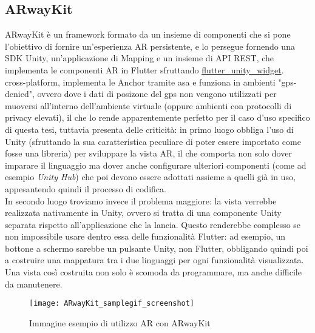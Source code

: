 \subsection{ARwayKit}
\label{subsec:arwaykit}
ARwayKit è un framework formato da un insieme di componenti che si pone l'obiettivo di fornire un'esperienza AR persistente, e lo persegue fornendo una SDK Unity, un'applicazione di Mapping e un insieme di API REST, che implementa le componenti AR in Flutter sfruttando \href{https://pub.dev/packages/flutter_unity_widget}{flutter\_unity\_widget}.\\
\E{} cross-platform, implementa le Anchor tramite asa e funziona in ambienti "gps-denied", ovvero dove i dati di posizone del gps non vengono utilizzati per muoversi all'interno dell'ambiente virtuale (oppure ambienti con protocolli di privacy elevati), il che lo rende apparentemente perfetto per il caso d'uso specifico di questa tesi, tuttavia presenta delle criticità: in primo luogo obbliga l'uso di Unity (sfruttando la sua caratteristica peculiare di poter essere importato come fosse una libreria) per sviluppare la vista AR, il che comporta non solo dover imparare il linguaggio ma dover anche configurare ulteriori componenti (come ad esempio \textit{Unity Hub}) che poi devono essere adottati assieme a quelli già in uso, appesantendo quindi il processo di codifica.\\
In secondo luogo troviamo invece il problema maggiore: la vista verrebbe realizzata nativamente in Unity, ovvero si tratta di una componente Unity separata rispetto all'applicazione che la lancia.
Questo renderebbe complesso se non impossibile usare dentro essa delle funzionalità Flutter: ad esempio, un bottone a schermo sarebbe un pulsante Unity, non Flutter, obbligando quindi poi a costruire una mappatura tra i due linguaggi per ogni funzionalità visualizzata.\\ 
Una vista così costruita non solo è scomoda da programmare, ma anche difficile da manutenere.\\

\begin{figure}[h!]
    \centering
    \texttt{[image: ARwayKit\_samplegif\_screenshot]}
    \caption{Immagine esempio di utilizzo AR con ARwayKit}
\end{figure}


